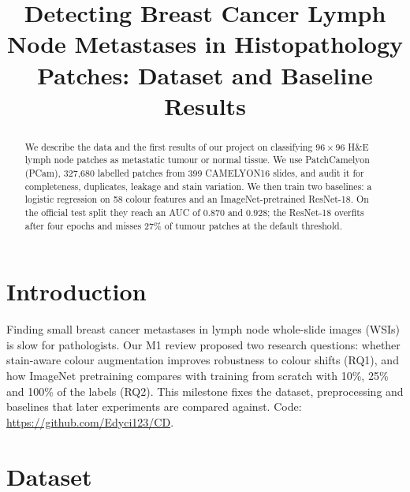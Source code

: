 \documentclass[conference]{IEEEtran}
\begin{document}
\title{Detecting Breast Cancer Lymph Node Metastases in Histopathology Patches: Dataset and Baseline Results}

\author{
}

\maketitle

\begin{abstract}
We describe the data and the first results of our project on classifying $96\times96$ H\&E lymph node patches as metastatic tumour or normal tissue. We use PatchCamelyon (PCam), 327,680 labelled patches from 399 CAMELYON16 slides, and audit it for completeness, duplicates, leakage and stain variation. We then train two baselines: a logistic regression on 58 colour features and an ImageNet-pretrained ResNet-18. On the official test split they reach an AUC of 0.870 and 0.928; the ResNet-18 overfits after four epochs and misses 27\% of tumour patches at the default threshold.
\end{abstract}

\section{Introduction}
Finding small breast cancer metastases in lymph node whole-slide images (WSIs) is slow for pathologists. Our M1 review proposed two research questions: whether stain-aware colour augmentation improves robustness to colour shifts (RQ1), and how ImageNet pretraining compares with training from scratch with 10\%, 25\% and 100\% of the labels (RQ2). This milestone fixes the dataset, preprocessing and baselines that later experiments are compared against. Code: \url{https://github.com/Edyci123/CD}.

\section{Dataset}
\end{document}
